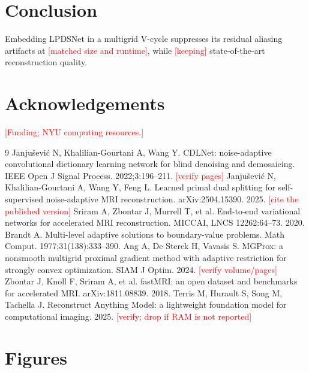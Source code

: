 \documentclass[10pt]{article}
\newcommand{\todo}[1]{\textcolor{red}{[#1]}}
\begin{document}
\section*{Conclusion}
Embedding LPDSNet in a multigrid V-cycle suppresses its residual aliasing artifacts at
\todo{matched size and runtime}, while \todo{keeping} state-of-the-art reconstruction quality.

\section*{Acknowledgements}
\todo{Funding; NYU computing resources.}

{\small
\begin{thebibliography}{9}
 Janjušević N, Khalilian-Gourtani A, Wang Y. CDLNet: noise-adaptive
  convolutional dictionary learning network for blind denoising and demosaicing. IEEE Open J
  Signal Process. 2022;3:196--211. \todo{verify pages}
 Janjušević N, Khalilian-Gourtani A, Wang Y, Feng L. Learned primal dual
  splitting for self-supervised noise-adaptive MRI reconstruction. arXiv:2504.15390. 2025.
  \todo{cite the published version}
 Sriram A, Zbontar J, Murrell T, et al. End-to-end variational networks for
  accelerated MRI reconstruction. MICCAI, LNCS 12262:64--73. 2020.
 Brandt A. Multi-level adaptive solutions to boundary-value problems. Math
  Comput. 1977;31(138):333--390.
 Ang A, De Sterck H, Vavasis S. MGProx: a nonsmooth multigrid proximal gradient
  method with adaptive restriction for strongly convex optimization. SIAM J Optim. 2024.
  \todo{verify volume/pages}
 Zbontar J, Knoll F, Sriram A, et al. fastMRI: an open dataset and benchmarks
  for accelerated MRI. arXiv:1811.08839. 2018.
 Terris M, Hurault S, Song M, Tachella J. Reconstruct Anything Model: a lightweight
  foundation model for computational imaging. 2025. \todo{verify; drop if RAM is not reported}
\end{thebibliography}}

\clearpage
\section*{Figures}
\end{document}
